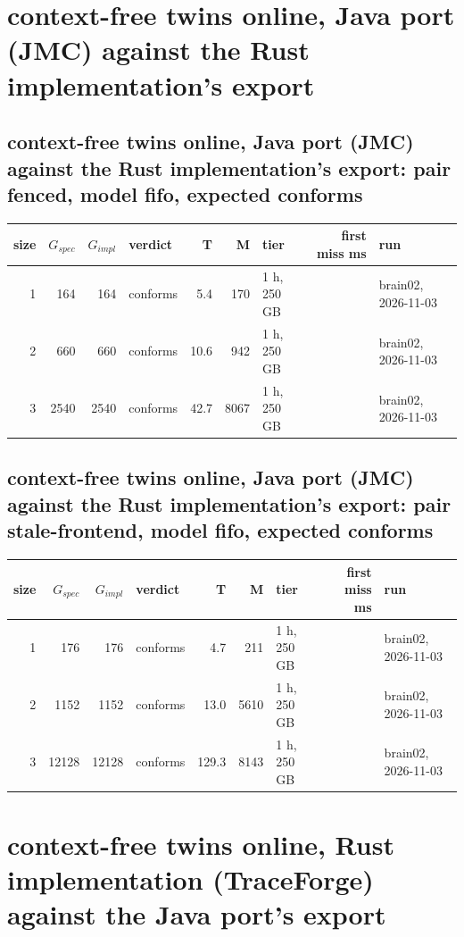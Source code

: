 \documentclass[10pt]{article}
\begin{document}
\section*{context-free twins online, Java port (JMC) against the Rust implementation's export}
\subsection*{context-free twins online, Java port (JMC) against the Rust implementation's export: pair \textsf{fenced}, model fifo, expected conforms}
\begin{longtable}{@{}rrrlrrlrl@{}}
\toprule
size & $G_{\mathit{spec}}$ & $G_{\mathit{impl}}$ & verdict & T & M & tier & first miss ms & run \\
\midrule
\endhead
\color{red} 1 & 164 & 164 & conforms & 5.4 & 170 & 1 h, 250 GB &  & brain02, 2026-11-03 \\
\color{red} 2 & 660 & 660 & conforms & 10.6 & 942 & 1 h, 250 GB &  & brain02, 2026-11-03 \\
\color{red} 3 & 2540 & 2540 & conforms & 42.7 & 8067 & 1 h, 250 GB &  & brain02, 2026-11-03 \\
\bottomrule
\end{longtable}
\subsection*{context-free twins online, Java port (JMC) against the Rust implementation's export: pair \textsf{stale-frontend}, model fifo, expected conforms}
\begin{longtable}{@{}rrrlrrlrl@{}}
\toprule
size & $G_{\mathit{spec}}$ & $G_{\mathit{impl}}$ & verdict & T & M & tier & first miss ms & run \\
\midrule
\endhead
\color{red} 1 & 176 & 176 & conforms & 4.7 & 211 & 1 h, 250 GB &  & brain02, 2026-11-03 \\
\color{red} 2 & 1152 & 1152 & conforms & 13.0 & 5610 & 1 h, 250 GB &  & brain02, 2026-11-03 \\
\color{red} 3 & 12128 & 12128 & conforms & 129.3 & 8143 & 1 h, 250 GB &  & brain02, 2026-11-03 \\
\bottomrule
\end{longtable}
\section*{context-free twins online, Rust implementation (TraceForge) against the Java port's export}
\end{document}
